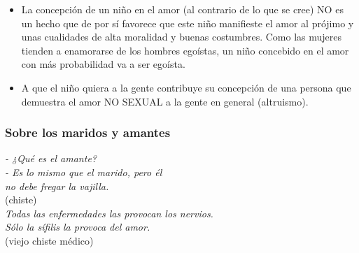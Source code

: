 \begin{itemize}

\item
  La concepción de un niño en el amor (al contrario de lo que se cree)
  NO es un hecho que de por sí favorece que este niño manifieste el amor
  al prójimo y unas cualidades de alta moralidad y buenas costumbres.
  Como las mujeres tienden a enamorarse de los hombres egoístas, un niño
  concebido en el amor con más probabilidad va a ser egoísta.
\item
  A que el niño quiera a la gente contribuye su concepción de una
  persona que demuestra el amor NO SEXUAL a la gente en general
  (altruismo).
\end{itemize}

\protect\hypertarget{M14}{}{}

\hypertarget{sobre-los-maridos-y-amantes}{\subsubsection{Sobre los maridos y amantes}\label{sobre-los-maridos-y-amantes}}

\noindent
\textit{- ¿Qué es el amante?}\\
\textit{- Es lo mismo que el marido, pero él}\\
\textit{no debe fregar la vajilla.}\\
(chiste)\\

\noindent
\textit{Todas las enfermedades las provocan los nervios.}\\
\textit{Sólo la sífilis la provoca del amor.}\\
(viejo chiste médico)\\



